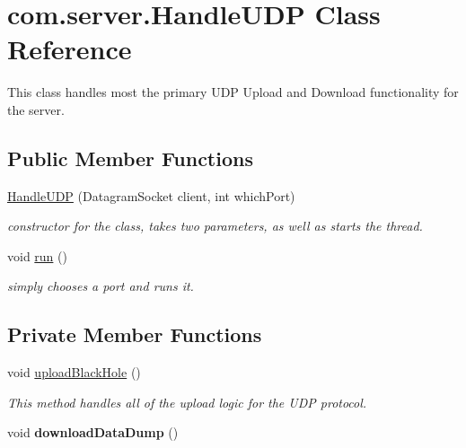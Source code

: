 \hypertarget{classcom_1_1server_1_1HandleUDP}{\section{com.\-server.\-Handle\-U\-D\-P Class Reference}
\label{classcom_1_1server_1_1HandleUDP}
}


This class handles most the primary U\-D\-P Upload and Download functionality for the server.  


\subsection*{Public Member Functions}
\begin{DoxyCompactItemize}
\item 
\hyperlink{classcom_1_1server_1_1HandleUDP_a0b8ef4313d758274df6927dc2e9e2dba}{Handle\-U\-D\-P} (Datagram\-Socket client, int which\-Port)
\begin{DoxyCompactList}\small\item\em constructor for the class, takes two parameters, as well as starts the thread. \end{DoxyCompactList}\item 
\hypertarget{classcom_1_1server_1_1HandleUDP_a321b13bfe67f933e522f7f3d184d9834}{void \hyperlink{classcom_1_1server_1_1HandleUDP_a321b13bfe67f933e522f7f3d184d9834}{run} ()}\label{classcom_1_1server_1_1HandleUDP_a321b13bfe67f933e522f7f3d184d9834}

\begin{DoxyCompactList}\small\item\em simply chooses a port and runs it. \end{DoxyCompactList}\end{DoxyCompactItemize}
\subsection*{Private Member Functions}
\begin{DoxyCompactItemize}
\item 
void \hyperlink{classcom_1_1server_1_1HandleUDP_aa4bfb125e4d66d55fefb7fbe88544d32}{upload\-Black\-Hole} ()
\begin{DoxyCompactList}\small\item\em This method handles all of the upload logic for the U\-D\-P protocol. \end{DoxyCompactList}\item 
\hypertarget{classcom_1_1server_1_1HandleUDP_ab6e9ceefc50e98e285c00dc8999f70e7}{void {\bfseries download\-Data\-Dump} ()}\label{classcom_1_1server_1_1HandleUDP_ab6e9ceefc50e98e285c00dc8999f70e7}

\end{DoxyCompactItemize}
